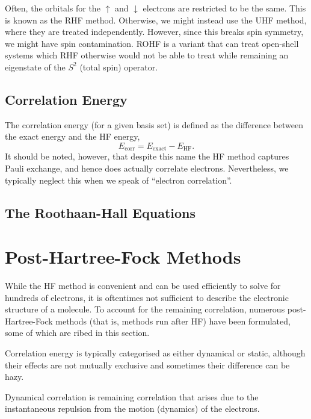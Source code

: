 Often, the orbitals for the $\uparrow$ and $\downarrow$ electrons are restricted to be the same. This is known as the \gls{RHF} method. Otherwise, we might instead use the \gls{UHF} method, where they are treated independently. However, since this breaks spin symmetry, we might have spin contamination. \gls{ROHF} is a variant that can treat open-shell systems which \gls{RHF} otherwise would not be able to treat while remaining an eigenstate of the $S^2$ (total spin) operator.

\subsection{Correlation Energy}

The correlation energy (for a given basis set) is defined as the difference between the exact energy and the \gls{HF} energy,
\begin{equation}
E_\mathrm{corr} = E_\mathrm{exact} - E_\mathrm{HF}.
\end{equation}
It should be noted, however, that despite this name the \gls{HF} method captures Pauli exchange, and hence does actually correlate electrons. Nevertheless, we typically neglect this when we speak of ``electron correlation''.

\subsection{The Roothaan-Hall Equations}


\section{Post-Hartree-Fock Methods}
\label{sec:post-hf}

While the \gls{HF} method is convenient and can be used efficiently to solve for hundreds of electrons, it is oftentimes not sufficient to describe the electronic structure of a molecule. To account for the remaining correlation, numerous post-Hartree-Fock methods (that is, methods run after \gls{HF}) have been formulated, some of which are ribed in this section.

Correlation energy is typically categorised as either dynamical or static, although their effects are not mutually exclusive and sometimes their difference can be hazy.

Dynamical correlation is remaining correlation that arises due to the instantaneous repulsion from the motion (dynamics) of the electrons.

